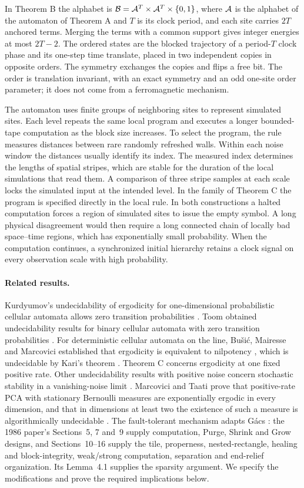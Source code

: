 In Theorem B the alphabet is \(\mathcal B=\mathcal A^T\times\mathcal A^T\times\{0,1\}\), where \(\mathcal A\) is the alphabet of the automaton of Theorem A and \(T\) is its clock period, and each site carries \(2T\) anchored terms. Merging the terms with a common support gives integer energies at most \(2T-2\). The ordered states are the blocked trajectory of a period-\(T\) clock phase and its one-step time translate, placed in two independent copies in opposite orders. The symmetry exchanges the copies and flips a free bit. The order is translation invariant, with an exact symmetry and an odd one-site order parameter; it does not come from a ferromagnetic mechanism.

The automaton uses finite groups of neighboring sites to represent simulated sites. Each level repeats the same local program and executes a longer bounded-tape computation as the block size increases. To select the program, the rule measures distances between rare randomly refreshed walls. Within each noise window the distances usually identify its index. The measured index determines the lengths of spatial stripes, which are stable for the duration of the local simulations that read them. A comparison of three stripe samples at each scale locks the simulated input at the intended level. In the family of Theorem C the program is specified directly in the local rule. In both constructions a halted computation forces a region of simulated sites to issue the empty symbol. A long physical disagreement would then require a long connected chain of locally bad space--time regions, which has exponentially small probability. When the computation continues, a synchronized initial hierarchy retains a clock signal on every observation scale with high probability.

\paragraph{Related results.}
Kurdyumov's undecidability of ergodicity for one-dimensional probabilistic cellular automata allows zero transition probabilities \cite{toomChapter}. Toom obtained undecidability results for binary cellular automata with zero transition probabilities \cite{toom}. For deterministic cellular automata on the line, Bu\v{s}i\'c, Mairesse and Marcovici established that ergodicity is equivalent to nilpotency \cite{bmm}, which is undecidable by Kari's theorem \cite{kari}. Theorem C concerns ergodicity at one fixed positive rate. Other undecidability results with positive noise concern stochastic stability in a vanishing-noise limit \cite{msStability}. Marcovici and Taati prove that positive-rate PCA with stationary Bernoulli measures are exponentially ergodic in every dimension, and that in dimensions at least two the existence of such a measure is algorithmically undecidable \cite{mtBernoulli}. The fault-tolerant mechanism adapts G\'acs \cite{gacs86,gacs01}: the 1986 paper's Sections~5, 7 and~9 supply computation, Purge, Shrink and Grow designs, and Sections~10--16 supply the tile, properness, nested-rectangle, healing and block-integrity, weak/strong computation, separation and end-relief organization. Its Lemma~4.1 supplies the sparsity argument. We specify the modifications and prove the required implications below.

